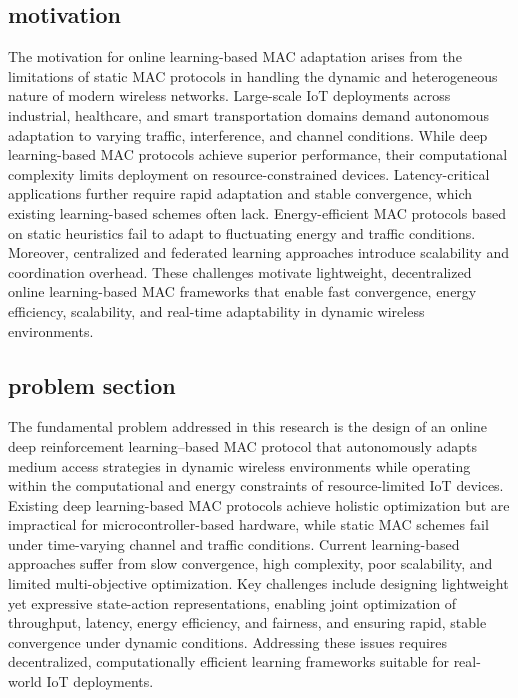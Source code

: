\documentclass[a4paper,fleqn]{cas-dc}
\numberwithin{equation}{section}
\begin{document}
\subsection{motivation}
The motivation for online learning-based MAC adaptation arises from the limitations of static MAC protocols in handling the dynamic and heterogeneous nature of modern wireless networks. Large-scale IoT deployments across industrial, healthcare, and smart transportation domains demand autonomous adaptation to varying traffic, interference, and channel conditions. While deep learning-based MAC protocols achieve superior performance, their computational complexity limits deployment on resource-constrained devices. Latency-critical applications further require rapid adaptation and stable convergence, which existing learning-based schemes often lack. Energy-efficient MAC protocols based on static heuristics fail to adapt to fluctuating energy and traffic conditions. Moreover, centralized and federated learning approaches introduce scalability and coordination overhead. These challenges motivate lightweight, decentralized online learning-based MAC frameworks that enable fast convergence, energy efficiency, scalability, and real-time adaptability in dynamic wireless environments.
\subsection{problem section}
The fundamental problem addressed in this research is the design of an online deep reinforcement learning–based MAC protocol that autonomously adapts medium access strategies in dynamic wireless environments while operating within the computational and energy constraints of resource-limited IoT devices. Existing deep learning-based MAC protocols achieve holistic optimization but are impractical for microcontroller-based hardware, while static MAC schemes fail under time-varying channel and traffic conditions. Current learning-based approaches suffer from slow convergence, high complexity, poor scalability, and limited multi-objective optimization. Key challenges include designing lightweight yet expressive state-action representations, enabling joint optimization of throughput, latency, energy efficiency, and fairness, and ensuring rapid, stable convergence under dynamic conditions. Addressing these issues requires decentralized, computationally efficient learning frameworks suitable for real-world IoT deployments.
\end{document}
